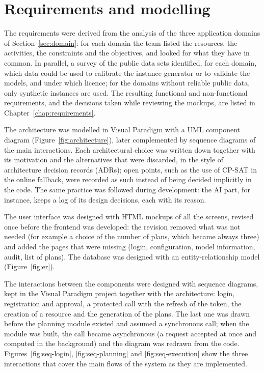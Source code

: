\section{Requirements and modelling}
\label{sec:modelling}

The requirements were derived from the analysis of the three application domains of
Section~\ref{sec:domain}: for each domain the team listed the resources, the activities, the
constraints and the objectives, and looked for what they have in common. In parallel, a survey of
the public data sets identified, for each domain, which data could be used to calibrate the
instance generator or to validate the models, and under which licence; for the domains without
reliable public data, only synthetic instances are used.
The resulting functional and non-functional requirements, and the decisions taken while
reviewing the mockups, are listed in Chapter~\ref{chap:requirements}.

The architecture was modelled in Visual Paradigm with a UML component diagram
(Figure~\ref{fig:architecture}), later complemented by sequence diagrams of the main
interactions. Each architectural choice was written down together with its motivation and the
alternatives that were discarded, in the style of architecture decision records (ADRs); open
points, such as the use of CP-SAT in the online fallback, were recorded as such instead of being
decided implicitly in the code. The same practice was followed during development: the AI part,
for instance, keeps a log of its design decisions, each with its reason.

The user interface was designed with HTML mockups of all the screens, revised once before the
frontend was developed: the revision removed what was not needed (for example a choice of the
number of plans, which became always three) and added the pages that were missing (login,
configuration, model information, audit, list of plans). The database was designed with an
entity-relationship model (Figure~\ref{fig:er}).

The interactions between the components were designed with sequence diagrams, kept in the Visual
Paradigm project together with the architecture: login, registration and approval, a protected
call with the refresh of the token, the creation of a resource and the generation of the plans.
The last one was drawn before the planning module existed and assumed a synchronous call; when
the module was built, the call became asynchronous (a request accepted at once and computed in
the background) and the diagram was redrawn from the code. Figures~\ref{fig:seq-login},
\ref{fig:seq-planning} and \ref{fig:seq-execution} show the three interactions that cover the
main flows of the system as they are implemented.

